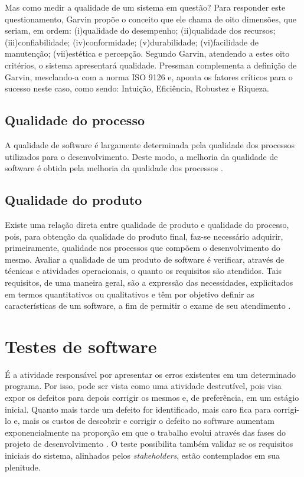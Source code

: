 \documentclass[tg]{mdtufsm}
\begin{document}
Mas como medir a qualidade de um sistema em questão? Para responder este questionamento, Garvin \citeyearpar{garvin1987competing} propõe o conceito que ele chama de
oito dimensões, que seriam, em ordem: (i)qualidade do desempenho; (ii)qualidade dos recursos; (iii)confiabilidade; (iv)conformidade; (v)durabilidade; (vi)facilidade de manutenção; (vii)estética e percepção. Segundo Garvin, atendendo a estes oito critérios, o sistema apresentará qualidade.
Pressman \citeyearpar{pressman2011engenharia} complementa a definição de Garvin, mesclando-a com a norma ISO 9126 e, aponta os fatores
críticos para o sucesso neste caso, como sendo: Intuição, Eficiência, Robustez e Riqueza.

\subsection{Qualidade do processo}
A qualidade de software é largamente determinada pela qualidade dos processos utilizados para o desenvolvimento. Deste modo, a melhoria
da qualidade de software é obtida pela melhoria da qualidade dos processos \cite{koscianski2007qualidade}.

\subsection{Qualidade do produto}
Existe uma relação direta entre qualidade de produto e qualidade do processo, pois, para obtenção da qualidade do produto final,
faz-se necessário adquirir, primeiramente, qualidade nos processos que compõem o desenvolvimento do mesmo.
Avaliar a qualidade de um produto de software é verificar, através de técnicas e atividades operacionais, o quanto os requisitos são atendidos. Tais requisitos,
de uma maneira geral, são a expressão das necessidades, explicitados em termos quantitativos ou qualitativos e têm por objetivo definir as características de
um software, a fim de permitir o exame de seu atendimento \cite{koscianski2007qualidade}.

\section{Testes de software}
É a atividade responsável por apresentar os erros existentes em um determinado programa. Por isso, pode ser vista como uma atividade destrutível, pois visa expor os defeitos para depois corrigir os mesmos e, de preferência, em um estágio inicial. Quanto mais tarde um defeito for identificado, mais caro fica para corrigi-lo e, mais os custos de descobrir e corrigir o defeito no software aumentam exponencialmente na proporção em que o trabalho
evolui através das fases do projeto de desenvolvimento \cite{boehm1976quantitative}. O teste possibilita também validar se os requisitos iniciais do sistema, alinhados pelos \emph{stakeholders}, estão contemplados em sua plenitude.
\end{document}
